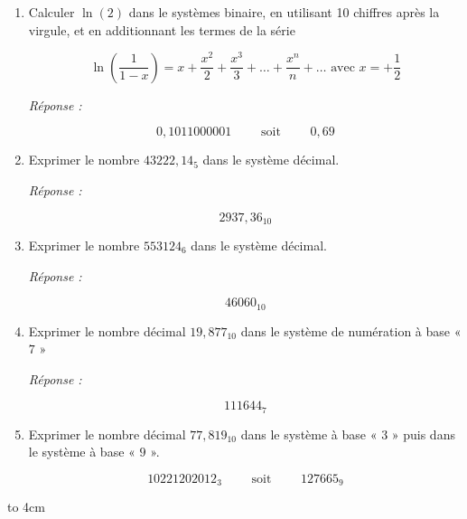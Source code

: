 \begin{enumerate} [label=\arabic*$^\circ$]
\item Calculer $\ln(2)$ dans le systèmes binaire, en utilisant 10 chiffres après la virgule, et en additionnant les termes de la série 

\[ \ln \left(\dfrac{1}{1-x}\right) = x + \dfrac{x^2}{2} + \dfrac{x^3}{3} + \ldots + \dfrac{x^n}{n} + \ldots \text{ avec } x = + \dfrac{1}{2}
 \]

\textsl{Réponse : }


\[ 0,1011000001 \qquad \text{ soit } \qquad 0,69 \] 

\item Exprimer le nombre $43222,14_5$ dans le système décimal. 

\textsl{Réponse : }

\[2937,36_{10} \]

\item Exprimer le nombre $553124_6$ dans le système décimal. 

\textsl{Réponse : }
 
 \[ 46060_{10} \]

\item Exprimer le nombre décimal $19,877_{10}$ dans le système de numération à base « $7$ » 

\textsl{Réponse : }
 
 \[ 111644_7 \]
 
 \item Exprimer le nombre décimal $77,819_{10}$ dans le système à base « $3$ » puis dans le système à base « $9$ ». 
 
 \[ 10221202012_3 \qquad \text{ soit } \qquad 127665_9 \] 

\end{enumerate}


\centerline { \hfill \hbox to 4cm  { \hrulefill } \hfill }

\medskip 

\ifdefined\COMPLETE
\else
    
\fi
